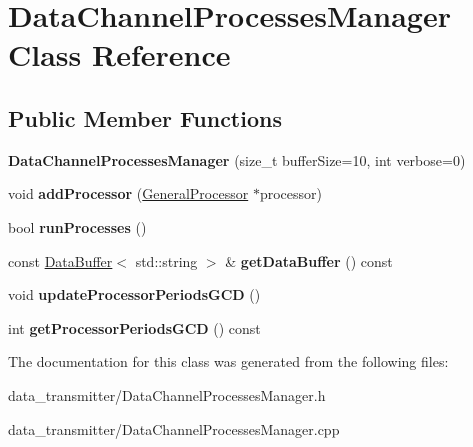 \hypertarget{classDataChannelProcessesManager}{\section{Data\-Channel\-Processes\-Manager Class Reference}
\label{classDataChannelProcessesManager}
}
\subsection*{Public Member Functions}
\begin{DoxyCompactItemize}
\item 
\hypertarget{classDataChannelProcessesManager_a3a71cfeed99217b18635683cf07a8014}{{\bfseries Data\-Channel\-Processes\-Manager} (size\-\_\-t buffer\-Size=10, int verbose=0)}\label{classDataChannelProcessesManager_a3a71cfeed99217b18635683cf07a8014}

\item 
\hypertarget{classDataChannelProcessesManager_a40100ed314dc614f2c535f1b2e28f07b}{void {\bfseries add\-Processor} (\hyperlink{classGeneralProcessor}{General\-Processor} $\ast$processor)}\label{classDataChannelProcessesManager_a40100ed314dc614f2c535f1b2e28f07b}

\item 
\hypertarget{classDataChannelProcessesManager_a63090b1f8218f4b59dee4e0ecfa5f3da}{bool {\bfseries run\-Processes} ()}\label{classDataChannelProcessesManager_a63090b1f8218f4b59dee4e0ecfa5f3da}

\item 
\hypertarget{classDataChannelProcessesManager_a7c34a2c0048fab892080250b4c4cdfc4}{const \hyperlink{classDataBuffer}{Data\-Buffer}$<$ std\-::string $>$ \& {\bfseries get\-Data\-Buffer} () const }\label{classDataChannelProcessesManager_a7c34a2c0048fab892080250b4c4cdfc4}

\item 
\hypertarget{classDataChannelProcessesManager_ad49743bdfab4fb5413f53cae8d036f91}{void {\bfseries update\-Processor\-Periods\-G\-C\-D} ()}\label{classDataChannelProcessesManager_ad49743bdfab4fb5413f53cae8d036f91}

\item 
\hypertarget{classDataChannelProcessesManager_a02850effa954af6fd8d044975cc03d84}{int {\bfseries get\-Processor\-Periods\-G\-C\-D} () const }\label{classDataChannelProcessesManager_a02850effa954af6fd8d044975cc03d84}

\end{DoxyCompactItemize}


The documentation for this class was generated from the following files\-:\begin{DoxyCompactItemize}
\item 
data\-\_\-transmitter/Data\-Channel\-Processes\-Manager.\-h\item 
data\-\_\-transmitter/Data\-Channel\-Processes\-Manager.\-cpp\end{DoxyCompactItemize}
